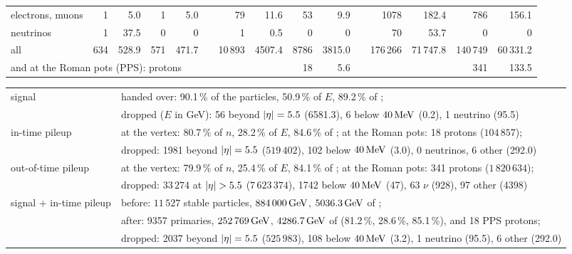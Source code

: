 \begin{table}[htbp]
\begin{tabular}{lrrrrcrrrrcrrrr}
electrons, muons & 1 & 5.0 & 1 & 5.0 & & 79 & 11.6 & 53 & 9.9 & & 1078 & 182.4 & 786 & 156.1 \\
neutrinos       & 1 & 37.5 & 0 & 0 & & 1 & 0.5 & 0 & 0 & & 70 & 53.7 & 0 & 0 \\
\midrule
all & 634 & 528.9 & 571 & 471.7 & & 10\,893 & 4507.4 & 8786 & 3815.0 & & 176\,266 & 71\,747.8 & 140\,749 & 60\,331.2 \\
\multicolumn{5}{l}{\quad and at the Roman pots (PPS): protons} & & & & 18 & 5.6 & & & & 341 & 133.5 \\
\bottomrule
\end{tabular}

\medskip
\begin{tabular}{ll}
\toprule
signal & handed over: 90.1\,\% of the particles, 50.9\,\% of $E$, 89.2\,\% of \pt{}; \\
 & dropped ($E$ in GeV): 56 beyond $|\eta|=5.5$ (6581.3), 6 below $40\,\mathrm{MeV}$ (0.2), 1 neutrino (95.5) \\
in-time pileup & at the vertex: 80.7\,\% of $n$, 28.2\,\% of $E$, 84.6\,\% of \pt{}; at the Roman pots: 18 protons ($104\,857$); \\
 & dropped: 1981 beyond $|\eta|=5.5$ ($519\,402$), 102 below $40\,\mathrm{MeV}$ (3.0), 0 neutrinos, 6 other (292.0) \\
out-of-time pileup & at the vertex: 79.9\,\% of $n$, 25.4\,\% of $E$, 84.1\,\% of \pt{}; at the Roman pots: 341 protons ($1\,820\,634$); \\
 & dropped: $33\,274$ at $\abseta>5.5$ ($7\,623\,374$), 1742 below $40\,\mathrm{MeV}$ (47), 63 $\nu$ (928), 97 other (4398) \\
signal + in-time pileup & before: $11\,527$ stable particles, $884\,000\,\mathrm{GeV}$, $5036.3\,\mathrm{GeV}$ of \pt{}; \\
 & after: 9357 primaries, $252\,769\,\mathrm{GeV}$, $4286.7\,\mathrm{GeV}$ of \pt{} (81.2\,\%, 28.6\,\%, 85.1\,\%), and 18 PPS protons; \\
 & dropped: 2037 beyond $|\eta|=5.5$ ($525\,983$), 108 below $40\,\mathrm{MeV}$ (3.2), 1 neutrino (95.5), 6 other (292.0) \\
\bottomrule
\end{tabular}
\end{table}

